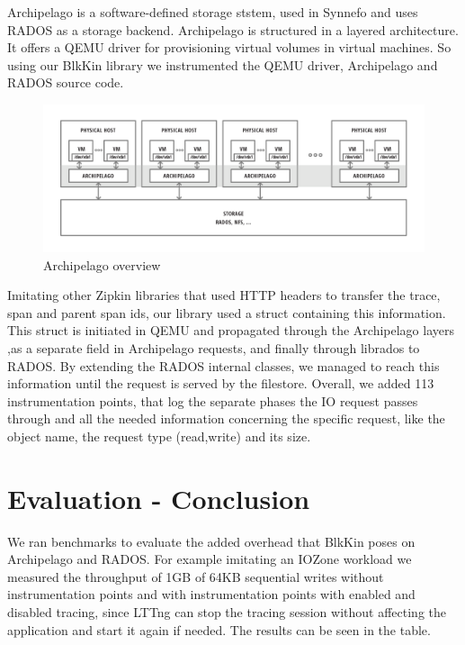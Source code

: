 \documentclass[a4paper,10pt,twocolumn]{article}
\begin{document}
Archipelago is a software-defined storage ststem, used in Synnefo\cite{synnefo}
and uses RADOS as a storage backend. Archipelago is structured in a layered
architecture. It offers a QEMU driver for provisioning virtual volumes in
virtual machines. So using our BlkKin library we instrumented the QEMU driver,
Archipelago and RADOS source code. 

\begin{figure}[h!]
  \centering
  \includegraphics[scale=0.3]{images/archipelago-overview.png}
  \caption{Archipelago overview}
  \label{fig:archipelago}
\end{figure}

Imitating other Zipkin libraries that used HTTP headers to transfer the trace,
span and parent span ids, our library used a struct containing this
information.  This struct is initiated in QEMU and propagated through the
Archipelago layers ,as a separate field in Archipelago requests, and finally
through librados to RADOS. By extending the RADOS internal classes, we managed
to reach this information until the request is served by the filestore.
Overall, we added 113 instrumentation points, that log the separate phases the
IO request passes through and all the needed information concerning the
specific request, like the object name, the request type (read,write) and its
size.

\section{Evaluation - Conclusion} 

We ran benchmarks to evaluate the added overhead that BlkKin poses on
Archipelago and RADOS. For example imitating an IOZone workload we measured the
throughput of 1GB of 64KB sequential writes without instrumentation points and
with instrumentation points with enabled and disabled tracing, since LTTng can
stop the tracing session without affecting the application and start it again if
needed. The results can be seen in the table.
\end{document}
